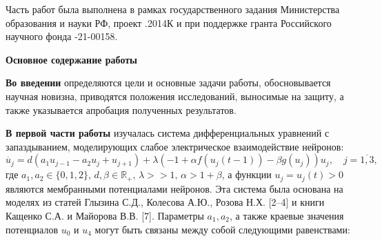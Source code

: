 \documentclass[12pt]{extarticle}
\begin{document}
Часть работ была выполнена в рамках государственного задания Министерства образования и науки РФ, проект  .2014К и при поддержке гранта Российского научного фонда -21-00158.

\hspace{0cm}

\hspace{0cm}

\hspace{0cm}

\begin{center}
{\Large \textbf{Основное содержание работы}}
\end{center}

\hspace{0cm}

\hspace{0cm}

\hspace{0cm}

\textbf{Во введении} определяются цели и основные задачи работы, обосновывается научная новизна, приводятся положения исследований, выносимые на защиту, а также указывается апробация полученных результатов.

\textbf{В первой части работы} изучалась система дифференциальных уравнений с запаздыванием, моделирующих слабое электрическое взаимодействие нейронов:
\begin{equation}\label{u_system} 
	\dot{u_j} = d(a_1u_{j-1}-a_2u_j+u_{j+1})+\lambda(-1+\alpha f(u_j(t-1)) - \beta g(u_j))u_j, \quad j = \overline{1,3},
\end{equation}
где $ a_1, a_2 \in \{ 0, 1, 2 \}, \, d , \beta \in \mathbb{R}_+, \, \lambda >> 1, \, \alpha > 1 + \beta $, а функции $ u_j=u_j(t) > 0 $ являются мембранными потенциалами нейронов. Эта система была основана на моделях из статей Глызина С.Д., Колесова А.Ю., Розова Н.Х. [2--4] и книги Кащенко С.А. и Майорова В.В. [7].  Параметры $ a_1, a_2 $, а также краевые значения потенциалов $ u_0 $ и $ u_4 $ могут быть связаны между собой следующими равенствами:
\end{document}
